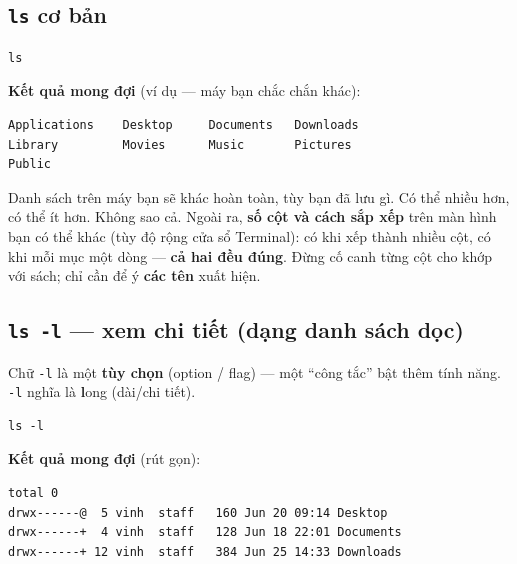 \documentclass[12pt,a4paper]{article}
\begin{document}
\subsection{\texttt{ls} cơ bản}

\begin{codebox}
\begin{verbatim}
ls
\end{verbatim}
\end{codebox}

\textbf{Kết quả mong đợi} (ví dụ --- máy bạn chắc chắn khác):

\begin{codebox}
\begin{verbatim}
Applications    Desktop     Documents   Downloads
Library         Movies      Music       Pictures
Public
\end{verbatim}
\end{codebox}

\begin{notebox}[title={Trấn an}]
Danh sách trên máy bạn sẽ khác hoàn toàn, tùy bạn đã lưu gì. Có thể nhiều hơn, có thể ít hơn. Không sao cả. Ngoài ra, \textbf{số cột và cách sắp xếp} trên màn hình bạn có thể khác (tùy độ rộng cửa sổ Terminal): có khi xếp thành nhiều cột, có khi mỗi mục một dòng --- \textbf{cả hai đều đúng}. Đừng cố canh từng cột cho khớp với sách; chỉ cần để ý \textbf{các tên} xuất hiện.
\end{notebox}

\subsection{\texttt{ls -l} --- xem chi tiết (dạng danh sách dọc)}

Chữ \texttt{-l} là một \textbf{tùy chọn} (option / flag) --- một ``công tắc'' bật thêm tính năng. \texttt{-l} nghĩa là \textbf{l}ong (dài/chi tiết).

\begin{codebox}
\begin{verbatim}
ls -l
\end{verbatim}
\end{codebox}

\textbf{Kết quả mong đợi} (rút gọn):

\begin{codebox}
\begin{verbatim}
total 0
drwx------@  5 vinh  staff   160 Jun 20 09:14 Desktop
drwx------+  4 vinh  staff   128 Jun 18 22:01 Documents
drwx------+ 12 vinh  staff   384 Jun 25 14:33 Downloads
\end{verbatim}
\end{codebox}
\end{document}
